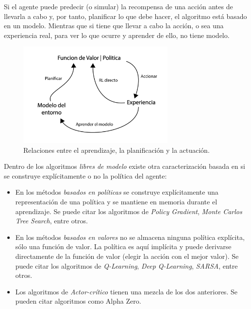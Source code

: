 Si el agente puede predecir (o simular) la recompensa de una acción antes de llevarla a cabo y, por tanto, planificar lo que debe hacer, el algoritmo está basado en un modelo. Mientras que si tiene que llevar a cabo la acción, o sea una experiencia real, para ver lo que ocurre y aprender de ello, no tiene modelo.

\begin{figure}[ht!]
    \centering
    \includegraphics[width=0.7\textwidth]{Graphics/rl-strategies.png}
    \caption{Relaciones entre el aprendizaje, la planificación y la actuación.}
    \label{fig:rl-strategies}
\end{figure}

Dentro de los algoritmos  \textit{libres de modelo} existe otra caracterización basada en si se construye explícitamente o no la política del agente:

\begin{itemize}
\item En los métodos \textit{basados en políticas} se construye explícitamente una representación de una política y se mantiene en memoria durante el aprendizaje. Se puede citar los algoritmos de \textit{Policy Gradient}, \textit{Monte Carlos Tree Search}, entre otros.

\item En los métodos \textit{basados en valores} no se almacena ninguna política explícita, sólo una función de valor. La política es aquí implícita y puede derivarse directamente de la función de valor (elegir la acción con el mejor valor). Se puede citar los algoritmos de \textit{Q-Learning}, \textit{Deep Q-Learning}, \textit{SARSA}, entre otros.

\item Los algoritmos de \textit{Actor-crítico} tienen una mezcla de los dos anteriores. Se pueden citar algoritmos como Alpha Zero.
\end{itemize}

